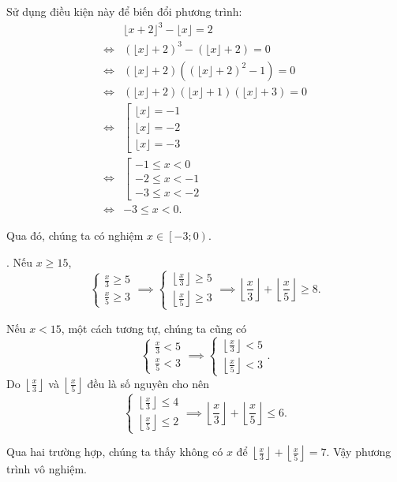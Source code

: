 Sử dụng điều kiện này để biến đổi phương trình:
\begin{align*}
   &\lfloor x + 2 \rfloor^3 - \lfloor x \rfloor = 2\\
   \iff &\left(\lfloor x \rfloor + 2\right)^3 - \left(\lfloor x \rfloor + 2\right) = 0 \\
   \iff &\left(\lfloor x \rfloor + 2\right)\left(\left(\lfloor x \rfloor + 2\right)^2 - 1\right) = 0 \\
   \iff &\left(\lfloor x \rfloor + 2\right)\left(\lfloor x \rfloor + 1\right)\left(\lfloor x \rfloor + 3\right) = 0 \\
   \iff &\left[\begin{array}{l}
      \lfloor x \rfloor = -1 \\
      \lfloor x \rfloor = -2 \\
      \lfloor x \rfloor = -3
   \end{array}\right. \\
   \iff &\left[\begin{array}{l}
      -1 \leq x < 0 \\
      -2 \leq x < -1 \\
      -3 \leq x < -2
   \end{array}\right. \\
   \iff & -3 \leq x < 0.
\end{align*}

Qua đó, chúng ta có nghiệm $x \in \left[-3; 0\right)$.

. Nếu $x \geq 15$, $$\begin{cases}
   \frac{x}{3} \geq 5 \\
   \frac{x}{5} \geq 3
\end{cases} \implies \begin{cases}
   \left\lfloor \frac{x}{3} \right\rfloor \geq 5 \\
   \left\lfloor \frac{x}{5} \right\rfloor \geq 3
\end{cases} \implies \left\lfloor \frac{x}{3} \right\rfloor + \left\lfloor \frac{x}{5} \right\rfloor \geq 8.$$

Nếu $x < 15$, một cách tương tự, chúng ta cũng có
\begin{equation*}
   \begin{cases}
      \frac{x}{3} < 5 \\
      \frac{x}{5} < 3
   \end{cases} \implies \begin{cases}
      \left\lfloor \frac{x}{3} \right\rfloor < 5 \\
      \left\lfloor \frac{x}{5} \right\rfloor < 3
   \end{cases}.
\end{equation*}
Do $\left\lfloor \frac{x}{3} \right\rfloor$ và $\left\lfloor \frac{x}{5} \right\rfloor$ đều là số nguyên cho nên
$$
\begin{cases}
   \left\lfloor \frac{x}{3} \right\rfloor \leq 4 \\
   \left\lfloor \frac{x}{5} \right\rfloor \leq 2
\end{cases} \implies \left\lfloor \frac{x}{3} \right\rfloor + \left\lfloor \frac{x}{5} \right\rfloor \leq 6.
$$

Qua hai trường hợp, chúng ta thấy không có $x$ để $\left\lfloor \frac{x}{3} \right\rfloor + \left\lfloor \frac{x}{5} \right\rfloor = 7$. Vậy phương trình vô nghiệm.